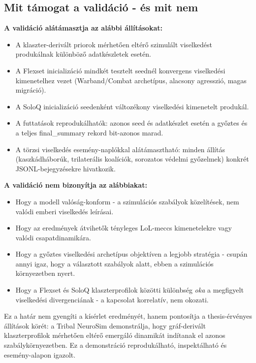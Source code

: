 ﻿\documentclass[a4paper,12pt]{report}
\begin{document}
\subsection*{Mit támogat a validáció - és mit nem}

\textbf{A validáció alátámasztja az alábbi állításokat:}

\begin{itemize}
  \item A klaszter-derivált priorok mérhetően eltérő szimulált viselkedést produkálnak különböző adatkészletek esetén.
  \item A Flexset inicializáció mindkét tesztelt seednél konvergens viselkedési kimenetelhez vezet (Warband/Combat archetípus, alacsony agresszió, magas migráció).
  \item A SoloQ inicializáció seedenként változékony viselkedési kimenetelt produkál.
  \item A futtatások reprodukálhatók: azonos seed és adatkészlet esetén a győztes és a teljes final\_summary rekord bit-azonos marad.
  \item A törzsi viselkedés esemény-naplókkal alátámasztható: minden állítás (kaszkádháborúk, trilaterális koalíciók, sorozatos védelmi győzelmek) konkrét JSONL-bejegyzésekre hivatkozik.
\end{itemize}

\textbf{A validáció nem bizonyítja az alábbiakat:}

\begin{itemize}
  \item Hogy a modell valóság-konform - a szimulációs szabályok közelítések, nem valódi emberi viselkedés leírásai.
  \item Hogy az eredmények átvihetők tényleges LoL-meccs kimenetelekre vagy valódi csapatdinamikára.
  \item Hogy a győztes viselkedési archetípus objektíven a legjobb stratégia - csupán annyi igaz, hogy a választott szabályok alatt, ebben a szimulációs környezetben nyert.
  \item Hogy a Flexset és SoloQ klaszterprofilok közötti különbség \textit{oka} a megfigyelt viselkedési divergenciának - a kapcsolat korrelatív, nem okozati.
\end{itemize}

Ez a határ nem gyengíti a kísérlet eredményét, hanem pontosítja a thesis-érvényes állítások körét: a Tribal NeuroSim demonstrálja, hogy gráf-derivált klaszterprofilok mérhetően eltérő emergáló dinamikát indítanak el azonos szabálykörnyezetben. Ez a demonstráció reprodukálható, inspektálható és esemény-alapon igazolt.
\end{document}
